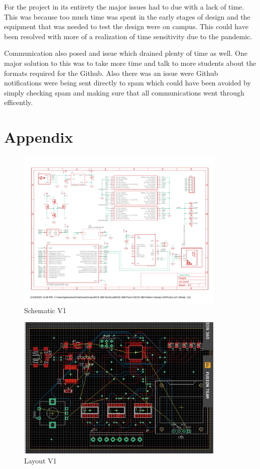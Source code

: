 \documentclass[12pt]{article}
\begin{document}
    \par For the project in its entirety the major issues had to due with a lack of time. This was because too much time was spent in the early stages of design and the equipment that was needed to test the design were on campus. This could have been resolved with more of a realization of time sensitivity due to the pandemic.
    \par Communication also posed and issue which drained plenty of time as well. One major solution to this was to take more time and talk to more students about the formats required for the Github. Also there was an issue were Github notifications were being sent directly to spam which could have been avoided by simply checking spam and making sure that all communications went through efficently. 
\section{Appendix}

\begin{figure}[htp]
    \centering
    \includegraphics[width=10cm]{ProjV1.pdf}
    \caption{Schematic V1}
\end{figure}

\begin{figure}[htp]
    \centering
    \includegraphics[width=10cm]{LayoutV1.png}
    \caption{Layout V1}
\end{figure}
\end{document}
